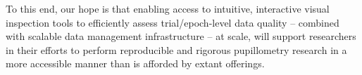 To this end, our hope is that enabling access to intuitive, interactive visual inspection tools to efficiently assess trial/epoch-level data quality – combined with scalable data management infrastructure – at scale, will support researchers in their efforts to perform reproducible and rigorous pupillometry research in a more accessible manner than is afforded by extant offerings.